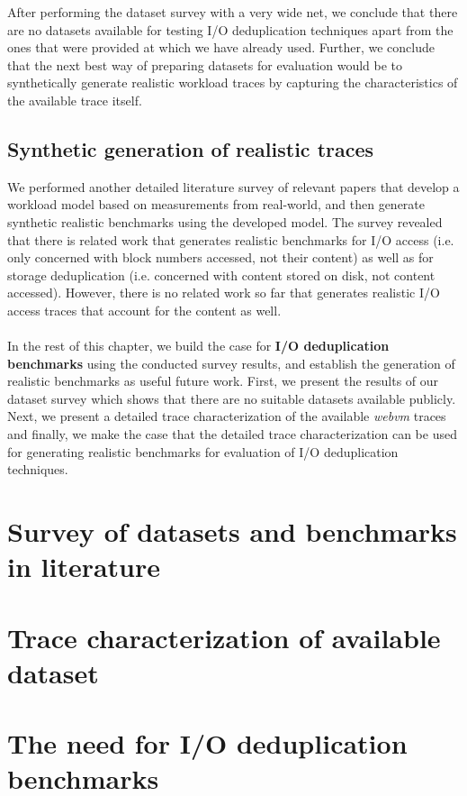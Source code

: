 After performing the dataset survey with a very wide net, we conclude that 
there are no datasets available for testing I/O deduplication techniques
apart from the ones that were provided at \cite{iodedup-online} which we
have already used. Further, we conclude that the next best way of
preparing datasets for evaluation would be to synthetically generate 
realistic workload traces by capturing the characteristics of the 
available trace itself. 

\subsection{Synthetic generation of realistic traces}
We performed another detailed
literature survey of relevant papers that develop a workload model
based on measurements from real-world, and then 
generate synthetic realistic benchmarks using
the developed model. The survey revealed that there is related work
that generates realistic benchmarks for I/O access (i.e. only concerned
with block numbers accessed, not their content) as well as for storage 
deduplication (i.e. concerned with content stored on disk, not content 
accessed). However, there is no related work so far that generates
realistic I/O access traces that account for the content as well. 
\\
\\
In the rest of this chapter, we build the case for 
\textbf{I/O deduplication benchmarks}
using the conducted survey results, and establish the generation of realistic
benchmarks as useful future work. First, we present the results of our
dataset survey which shows that there are no suitable datasets available
publicly. Next, we present a detailed trace characterization of the 
available \textit{webvm} traces~\cite{iodedup-online} and finally, we make the
case that the detailed trace characterization can be used for generating
realistic benchmarks for evaluation of I/O deduplication techniques.

\section{Survey of datasets and benchmarks in literature}
\label{sec:architectingchap-survey}


\section{Trace characterization of available dataset} %
\label{sec:architectingchap-tracechar}


\section{The need for I/O deduplication benchmarks}
\label{sec:architectingchap-case}

